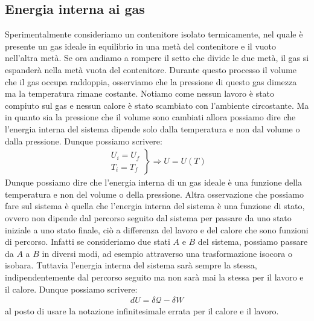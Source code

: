     \subsection{Energia interna ai gas}
        Sperimentalmente consideriamo un contenitore isolato termicamente, nel quale è presente un gas ideale in equilibrio in una metà del contenitore e il vuoto nell'altra metà. Se ora andiamo a rompere il setto che divide le due metà, il gas si espanderà nella metà vuota del contenitore. Durante questo processo il volume che il gas occupa raddoppia, osserviamo che la pressione di questo gas dimezza ma la temperatura rimane costante. Notiamo come nessun lavoro è stato compiuto sul gas e nessun calore è stato scambiato con l'ambiente circostante. Ma in quanto sia la pressione che il volume sono cambiati allora possiamo dire che l'energia interna del sistema dipende solo dalla temperatura e non dal volume o dalla pressione. Dunque possiamo scrivere:
        \begin{align*}
            \left.\begin{aligned}
                U_i = U_f\\
                T_i = T_f
            \end{aligned}\right\}\Rightarrow U=U(T)
        \end{align*}
        Dunque possiamo dire che l'energia interna di un gas ideale è una funzione della temperatura e non del volume o della pressione.\newline
        Altra osservazione che possiamo fare sul sistema è quella che l'energia interna del sistema è una funzione di stato, ovvero non dipende dal percorso seguito dal sistema per passare da uno stato iniziale a uno stato finale, ciò a differenza del lavoro e del calore che sono funzioni di percorso. Infatti se consideriamo due stati $A$ e $B$ del sistema, possiamo passare da $A$ a $B$ in diversi modi, ad esempio attraverso una trasformazione isocora o isobara. Tuttavia l'energia interna del sistema sarà sempre la stessa, indipendentemente dal percorso seguito ma non sarà mai la stessa per il lavoro e il calore. Dunque possiamo scrivere:
        \begin{align*}
            d U = \delta \mathcal{Q} - \delta W
        \end{align*}
        al posto di usare la notazione infinitesimale errata per il calore e il lavoro.
